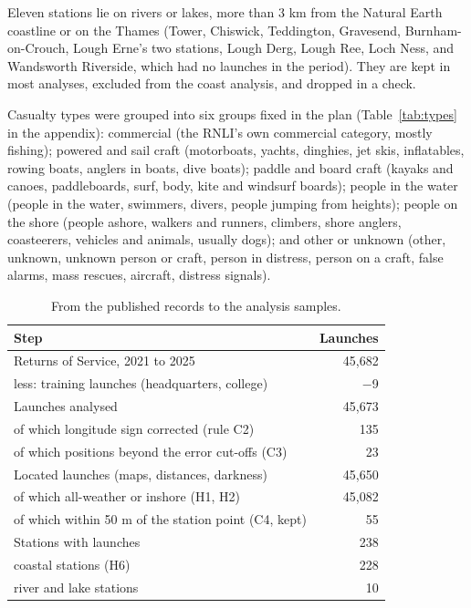 \documentclass[11pt,a4paper]{article}
\begin{document}
Eleven stations lie on rivers or lakes, more than 3 km from the Natural Earth coastline or on the Thames (Tower, Chiswick, Teddington, Gravesend, Burnham-on-Crouch, Lough Erne's two stations, Lough Derg, Lough Ree, Loch Ness, and Wandsworth Riverside, which had no launches in the period). They are kept in most analyses, excluded from the coast analysis, and dropped in a check.

Casualty types were grouped into six groups fixed in the plan (Table~\ref{tab:types} in the appendix): commercial (the RNLI's own commercial category, mostly fishing); powered and sail craft (motorboats, yachts, dinghies, jet skis, inflatables, rowing boats, anglers in boats, dive boats); paddle and board craft (kayaks and canoes, paddleboards, surf, body, kite and windsurf boards); people in the water (people in the water, swimmers, divers, people jumping from heights); people on the shore (people ashore, walkers and runners, climbers, shore anglers, coasteerers, vehicles and animals, usually dogs); and other or unknown (other, unknown, unknown person or craft, person in distress, person on a craft, false alarms, mass rescues, aircraft, distress signals).

\begin{table}[tbp]\centering\small\caption{From the published records to the analysis samples.}\label{tab:flow}\begin{tabular}{lr}\toprule Step & Launches\\\midrule
Returns of Service, 2021 to 2025 & 45,682\\
\quad less: training launches (headquarters, college) & $-$9\\\midrule
Launches analysed & 45,673\\
\quad of which longitude sign corrected (rule C2) & 135\\
\quad of which positions beyond the error cut-offs (C3) & 23\\
Located launches (maps, distances, darkness) & 45,650\\
\quad of which all-weather or inshore (H1, H2) & 45,082\\
\quad of which within 50 m of the station point (C4, kept) & 55\\\midrule
Stations with launches & 238\\
\quad coastal stations (H6) & 228\\
\quad river and lake stations & 10\\
\bottomrule\end{tabular}\end{table}
\end{document}
